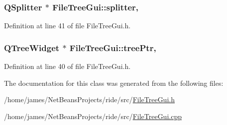 \hypertarget{class_file_tree_gui_a43e8677ba8c50059d003f298b631e131}{
\subsubsection[{splitter}]{\setlength{\rightskip}{0pt plus 5cm}Q\-Splitter $\ast$ File\-Tree\-Gui\-::splitter\hspace{0.3cm}{\ttfamily [static]}, {\ttfamily [private]}}}\label{class_file_tree_gui_a43e8677ba8c50059d003f298b631e131}


Definition at line 41 of file File\-Tree\-Gui.\-h.

\hypertarget{class_file_tree_gui_a46dee8099b8a67b854a57a761528b493}{
\subsubsection[{tree\-Ptr}]{\setlength{\rightskip}{0pt plus 5cm}Q\-Tree\-Widget $\ast$ File\-Tree\-Gui\-::tree\-Ptr\hspace{0.3cm}{\ttfamily [static]}, {\ttfamily [private]}}}\label{class_file_tree_gui_a46dee8099b8a67b854a57a761528b493}


Definition at line 40 of file File\-Tree\-Gui.\-h.



The documentation for this class was generated from the following files\-:\begin{DoxyCompactItemize}
\item 
/home/james/\-Net\-Beans\-Projects/ride/src/\hyperlink{_file_tree_gui_8h}{File\-Tree\-Gui.\-h}\item 
/home/james/\-Net\-Beans\-Projects/ride/src/\hyperlink{_file_tree_gui_8cpp}{File\-Tree\-Gui.\-cpp}\end{DoxyCompactItemize}
